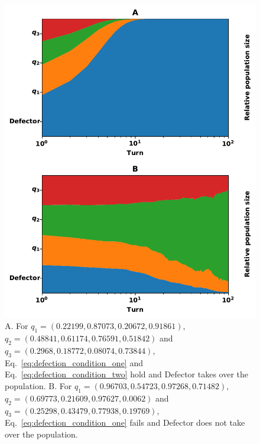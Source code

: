 \documentclass[10pt]{article}
\begin{document}
\begin{figure}[!htbp]
    \centering
    \includegraphics[width=.4\linewidth]{img/stability_of_defection_plots.pdf}
    \caption{A. For \(q_{1}=(0.22199, 0.87073, 0.20672, 0.91861)\),
    $q_{2}=(0.48841, 0.61174, 0.76591, 0.51842)$ and
    $q_{3}=(0.2968, 0.18772, 0.08074, 0.73844)$, Eq.~\ref{eq:defection_condition_one} and
    Eq.~\ref{eq:defection_condition_two} hold and Defector takes over the
    population. B. For $q_{1}=(0.96703, 0.54723, 0.97268, 0.71482)$,
    $q_{2}=(0.69773, 0.21609, 0.97627, 0.0062)$ and
    $q_{3}=(0.25298, 0.43479, 0.77938, 0.19769)$, Eq.~\ref{eq:defection_condition_one} fails
    and Defector does not take over the population.}\label{fig:stability_of_defection}
\end{figure}
\end{document}
